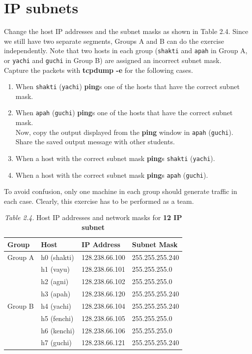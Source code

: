 \documentclass[10pt,a4paper]{article}
\numberwithin{equation}{section}
\numberwithin{figure}{section}
\numberwithin{table}{section}
\begin{document}
\section{IP subnets}
    Change the host IP addresses and the subnet masks as shown in Table 2.4. Since we still have two separate segments, Groups A and B can do the exercise independently.
    Note that two hosts in each group (\texttt{shakti} and \texttt{apah} in Group A, or \texttt{yachi} and \texttt{guchi} in Group B) are assigned an incorrect subnet mask. \\
    Capture the packets with \textbf{tcpdump -e} for the following cases. \\
    \begin{enumerate}
        \item When \texttt{shakti} (\texttt{yachi}) \textbf{ping}s one of the hosts that have the correct subnet mask.
        \item When \texttt{apah} (\texttt{guchi}) \textbf{ping}s one of the hosts that have the correct subnet mask. \\ Now, copy the output displayed from the \textbf{ping} window in \texttt{apah} (\texttt{guchi}).
        Share the saved output message with other students.
        \item When a host with the correct subnet mask \textbf{ping}s \texttt{shakti} (\texttt{yachi}).
        \item When a host with the correct subnet mask \textbf{ping}s \texttt{apah} (\texttt{guchi}).
    \end{enumerate}
    To avoid confusion, only one machine in each group should generate traffic in each case.
    Clearly, this exercise has to be performed as a team.
    \begin{table}[H]
        \caption{\textit{Table 2.4.} Host IP addresses and network masks for \textbf{12 IP subnet}}
        \vspace{5pt}
        \centering
        \begin{tabular}{ l l l l }
            \hline \hline
            Group & Host & IP Address & Subnet Mask \\
            \hline 
            Group A & h0 (shakti) & 128.238.66.100 & 255.255.255.240 \\
                    & h1 (vayu) & 128.238.66.101 & 255.255.255.0 \\
                    & h2 (agni) & 128.238.66.102 & 255.255.255.0 \\
                    & h3 (apah) & 128.238.66.120 & 255.255.255.240 \\
                    \hline
            Group B & h4 (yachi) & 128.238.66.104 & 255.255.255.240 \\
                    & h5 (fenchi) & 128.238.66.105 & 255.255.255.0 \\
                    & h6 (kenchi) & 128.238.66.106 & 255.255.255.0 \\
                    & h7 (guchi) & 128.238.66.121 & 255.255.255.240 \\
            \hline \hline
            \end{tabular}
    \end{table}
\end{document}
